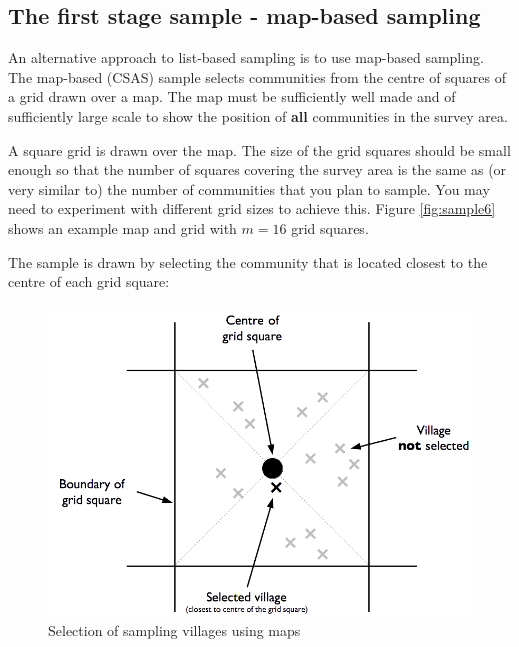 \documentclass[12pt,a4paper]{book}
\theoremstyle{definition}
\theoremstyle{definition}
\theoremstyle{definition}
\theoremstyle{remark}
\begin{document}
\newpage

\hypertarget{the-first-stage-sample---map-based-sampling}{%
\subsection{The first stage sample - map-based
sampling}\label{the-first-stage-sample---map-based-sampling}}

An alternative approach to list-based sampling is to use map-based
sampling. The map-based (CSAS) sample selects communities from the
centre of squares of a grid drawn over a map. The map must be
sufficiently well made and of sufficiently large scale to show the
position of \textbf{all} communities in the survey area.

A square grid is drawn over the map. The size of the grid squares should
be small enough so that the number of squares covering the survey area
is the same as (or very similar to) the number of communities that you
plan to sample. You may need to experiment with different grid sizes to
achieve this. Figure \ref{fig:sample6} shows an example map and grid
with \(m = 16\) grid squares.

The sample is drawn by selecting the community that is located closest
to the centre of each grid square:

\begin{figure}[H]

{\centering \includegraphics[width=11.17in]{figures/mapSample1} 

}

\caption{Selection of sampling villages using maps}\label{fig:sample5}
\end{figure}
\end{document}
